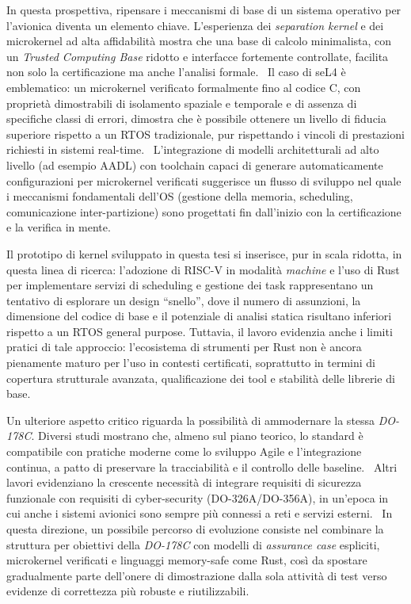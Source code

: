 \documentclass[italian, Lau, oneside]{sapthesis} %
\begin{document}
In questa prospettiva, ripensare i meccanismi di base di un sistema operativo per l’avionica diventa un elemento chiave. L’esperienza dei \textit{separation kernel} e dei microkernel ad alta affidabilità mostra che una base di calcolo minimalista, con un \textit{Trusted Computing Base} ridotto e interfacce fortemente controllate, facilita non solo la certificazione ma anche l’analisi formale.~\cite{ref:zhao2016} Il caso di seL4 è emblematico: un microkernel verificato formalmente fino al codice C, con proprietà dimostrabili di isolamento spaziale e temporale e di assenza di specifiche classi di errori, dimostra che è possibile ottenere un livello di fiducia superiore rispetto a un RTOS tradizionale, pur rispettando i vincoli di prestazioni richiesti in sistemi real-time.~\cite{ref:klein2009} L’integrazione di modelli architetturali ad alto livello (ad esempio AADL) con toolchain capaci di generare automaticamente configurazioni per microkernel verificati suggerisce un flusso di sviluppo nel quale i meccanismi fondamentali dell’OS (gestione della memoria, scheduling, comunicazione inter-partizione) sono progettati fin dall’inizio con la certificazione e la verifica in mente.~\cite{ref:belt2022}

Il prototipo di kernel sviluppato in questa tesi si inserisce, pur in scala ridotta, in questa linea di ricerca: l’adozione di RISC-V in modalità \textit{machine} e l’uso di Rust per implementare servizi di scheduling e gestione dei task rappresentano un tentativo di esplorare un design “snello”, dove il numero di assunzioni, la dimensione del codice di base e il potenziale di analisi statica risultano inferiori rispetto a un RTOS general purpose. Tuttavia, il lavoro evidenzia anche i limiti pratici di tale approccio: l’ecosistema di strumenti per Rust non è ancora pienamente maturo per l’uso in contesti certificati, soprattutto in termini di copertura strutturale avanzata, qualificazione dei tool e stabilità delle librerie di base.~\cite{ref:crustacea2023,ref:seidel2024,ref:zaeske2025}

Un ulteriore aspetto critico riguarda la possibilità di ammodernare la stessa \textit{DO-178C}. Diversi studi mostrano che, almeno sul piano teorico, lo standard è compatibile con pratiche moderne come lo sviluppo Agile e l’integrazione continua, a patto di preservare la tracciabilità e il controllo delle baseline.~\cite{ref:ribeiro2023} Altri lavori evidenziano la crescente necessità di integrare requisiti di sicurezza funzionale con requisiti di cyber-security (DO-326A/DO-356A), in un’epoca in cui anche i sistemi avionici sono sempre più connessi a reti e servizi esterni.~\cite{ref:torens2020} In questa direzione, un possibile percorso di evoluzione consiste nel combinare la struttura per obiettivi della \textit{DO-178C} con modelli di \textit{assurance case} espliciti, microkernel verificati e linguaggi memory-safe come Rust, così da spostare gradualmente parte dell’onere di dimostrazione dalla sola attività di test verso evidenze di correttezza più robuste e riutilizzabili.
\end{document}
